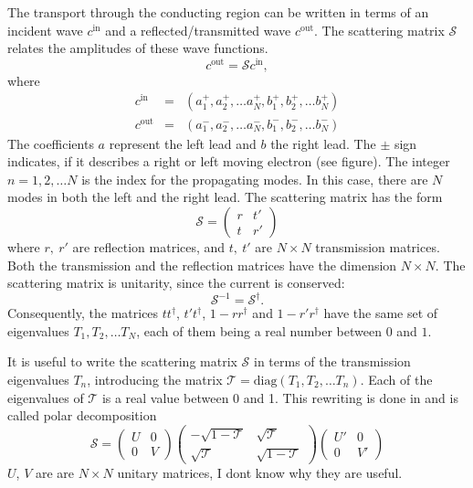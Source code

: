 The transport through the conducting region can be written in terms of an incident wave $c^\text{in}$ and a reflected/transmitted wave $c^\text{out}$. The scattering matrix $\mathcal{S}$ relates the amplitudes of these wave functions.
\begin{equation}
c^{\text{out}} = \mathcal{S} c^{\text{in}},
\end{equation}
where
\begin{eqnarray}
c^\text{in} &=& \left( a_1^+, a_2^+, \dots a_N^+, b_1^+, b_2^+, \dots b_N^+ \right) \\
c^\text{out} &=& \left( a_1^-, a_2^-, \dots a_N^-, b_1^-, b_2^-, \dots b_N^- \right)
\end{eqnarray}
The coefficients $a$ represent the left lead and $b$ the right lead. The $\pm$ sign indicates, if it describes a right or left moving electron (see figure). The integer $n = 1, 2, \dots N$ is the index for the propagating modes. In this case, there are $N$ modes in both the left and the right lead. %
The scattering matrix has the form
\begin{equation}
\mathcal{S} = \begin{pmatrix} r & t' \\ t & r'\end{pmatrix}
\end{equation}
where $r,\ r'$ are reflection matrices, and $t,\ t'$ are $N \times N $ transmission matrices. Both the transmission and the reflection matrices have the dimension $N \times N$. The scattering matrix is unitarity, since the current is conserved:
\begin{equation}
\mathcal{S}^{-1} = \mathcal{S}^\dagger.
\end{equation}
Consequently, the matrices $tt^\dagger$, $t't^\dagger$, $1-rr^\dagger$ and $1-r'r^\dagger$ have the same set of eigenvalues $T_1, T_2, \dots T_N$, each of them being a real number between $0$ and $1$.

It is useful to write the scattering matrix $\mathcal{S}$ in terms of the transmission eigenvalues $T_n$, introducing the matrix $\mathcal{T} = \text{diag} ( T_1, T_2, \dots T_n )$. Each of the eigenvalues of $\mathcal{T}$ is a real value between 0 and 1. This rewriting is done in \cite{Mello1988} and is called polar decomposition
\begin{equation}
\mathcal{S} = \begin{pmatrix} U & 0 \\ 0 & V\end{pmatrix} \begin{pmatrix} - \sqrt{1 - \mathcal{T}} & \sqrt{\mathcal{T}} \\ \sqrt{\mathcal{T}}& \sqrt{1 - \mathcal{T}} \end{pmatrix} \begin{pmatrix} U' & 0 \\ 0 & V' \end{pmatrix}
\end{equation}
$U$, $V$ are are $N\times N $ unitary matrices, I dont know why they are useful.

